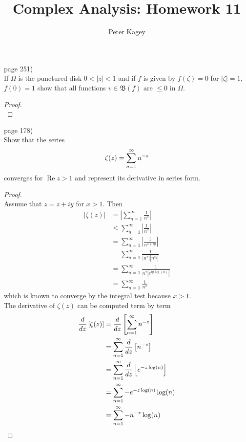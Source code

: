 \documentclass{article}
\newenvironment{problem}[2][Problem]{\begin{trivlist}
\item[\hskip \labelsep {\bfseries #1}\hskip \labelsep {\bfseries #2.}]}{\end{trivlist}}
\begin{document}
\title{Complex Analysis: Homework 11}
\author{Peter Kagey}

\maketitle

\begin{problem}{1} (page 251) \\
  If $\Omega$ is the punctured disk $0 < |z| < 1$ and if $f$ is given by
  $f(\zeta) = 0$ for $|\zeta| = 1$, $f(0) = 1$ show that all functions
  $v \in \mathfrak{B}(f)$ are $\leq 0$ in $\Omega$.
\end{problem}
\begin{proof} \text{} \\
\end{proof}
\pagebreak


\begin{problem}{2} (page 178) \\
  Show that the series \[
    \zeta(z) = \sum\displaylimits_{n=1}^\infty n^{-z}
  \] converges for $\operatorname{Re} z > 1$ and represent its derivative in
  series form.
\end{problem}
\begin{proof} \text{} \\
  Assume that $z = z + iy$ for $x > 1$. Then \begin{align}
    |\zeta(z)|
      &= \left|\sum_{n=1}^\infty \frac{1}{n^z}\right| \\
      &\leq \sum_{n=1}^\infty \left|\frac{1}{n^z}\right| \\
      &= \sum_{n=1}^\infty \left|\frac{1}{n^{z + iy}}\right| \\
      &= \sum_{n=1}^\infty \frac{1}{|n^{x}||n^{iy}|} \\
      &= \sum_{n=1}^\infty \frac{1}{n^{x}|e^{iy\log(n)}|} \\
      &= \sum_{n=1}^\infty \frac{1}{n^{x}}
  \end{align} which is known to converge by the integral test because $x > 1$. \\
  The derivative of $\zeta(z)$ can be computed term by term \begin{align*}
    \frac{d}{dz}\left[\zeta(z)\right]
    &= \frac{d}{dz}\left[\sum\displaylimits_{n=1}^\infty n^{-z}\right] \\
    &= \sum\displaylimits_{n=1}^\infty\frac{d}{dz}\left[n^{-z}\right] \\
    &= \sum\displaylimits_{n=1}^\infty\frac{d}{dz}\left[e^{-z\log(n)}\right] \\
    &= \sum\displaylimits_{n=1}^\infty -e^{-z\log(n)}\log(n) \\
    &= \sum\displaylimits_{n=1}^\infty -n^{-z}\log(n)
  \end{align*}
\end{proof}
\pagebreak
\end{document}
